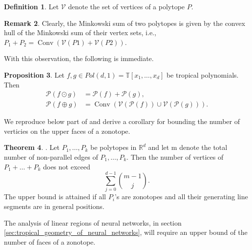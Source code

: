 \documentclass{article}
\theoremstyle{definition}
\newtheorem{theorem}{Theorem}[section]
\newtheorem{definition}[theorem]{Definition}
\newtheorem{proposition}[theorem]{Proposition}
\newtheorem{remark}[theorem]{Remark}
\DeclareMathOperator{\Conv}{Conv}
\begin{document}
\begin{definition}\hspace{1sp}\cite{zhang2018tropical}
Let $\mathcal{V}$ denote the set of vertices of a polytope $P$.
\end{definition}

\begin{remark}\hspace{1sp}\cite{zhang2018tropical}
Clearly, the Minkowski sum of two polytopes is given by the convex hull of the Minkowski sum of their vertex sets, i.e., $P_{1} + P_{2} = \Conv(\mathcal{V}(P1) + \mathcal{V}(P2))$.
\end{remark}
With this observation, the following is immediate.
\begin{proposition}\hspace{1sp}\cite[p.~4]{zhang2018tropical}
\label{prop:p_mult_add}
Let $f, g \in Pol(d, 1) = \mathbb{T}[x_1, \dots , x_d]$ be tropical polynomials. Then
\begin{align*}
\mathcal{P}(f \odot g) &= \mathcal{P}(f) + \mathcal{P}(g), \\
\mathcal{P}(f \oplus g) &= \Conv(\mathcal{V}(\mathcal{P}(f)) \cup \mathcal{V}( \mathcal{P}(g))).
\end{align*}
\end{proposition}

We reproduce below part of \cite[Theorem 2.1.20]{gritzmann1993minkowski} and derive a corollary for bounding the number of verticies on the upper faces of a zonotope.

\begin{theorem}\hspace{1sp}\label{theo:gritzmann_sturmfels}
\cite{gritzmann1993minkowski}. Let $P_1, \dots , P_k$ be polytopes in $\mathbb{R}^{d}$ and let m denote the total number of non-parallel edges of $P_1, \dots , P_k$. Then the number of vertices of $P_1 + \dots + P_k$ does not exceed
$$\sum_{j=0}^{d-1} \binom{m-1}{j}.$$
The upper bound is attained if all $P_i$'s are zonotopes and all their generating line segments are in general positions.
\end{theorem}

The analysis of linear regions of neural networks, in section \ref{sec:tropical_geometry_of_neural_networks}, will require an upper bound of the number of faces of a zonotope.
\end{document}
